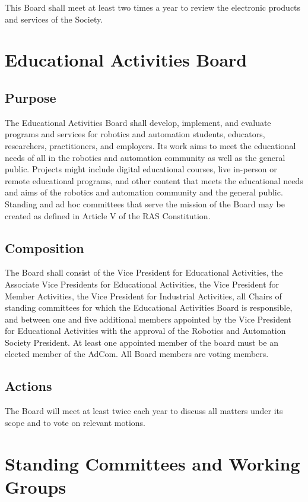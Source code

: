 \documentclass[10pt]{article}
\begin{document}
This Board shall meet at least two times a year to review the electronic products and services of the Society.


\section{Educational Activities Board}
\label{EAB}

\subsection{Purpose}
The Educational Activities Board shall develop, implement, and evaluate programs and services for robotics and automation students, educators, researchers, practitioners, and employers. Its work aims to meet the educational needs of all in the robotics and automation community as well as the general public. Projects might include digital educational courses, live in-person or remote educational programs, and other content that meets the educational needs and aims of the robotics and automation community and the general public. Standing and ad hoc committees that serve the mission of the Board may be created as defined in Article V of the RAS Constitution. 


\subsection{Composition}

The Board shall consist of the Vice President for Educational Activities, the Associate Vice Presidents for Educational Activities, the Vice President for Member Activities, the Vice President for Industrial Activities, all Chairs of standing committees for which the Educational Activities Board is responsible, and between one and five additional members appointed by the Vice President for Educational Activities with the approval of the Robotics and Automation Society President. At least one appointed member of the board must be an elected member of the AdCom. All Board members are voting members. 

\subsection{Actions}
The Board will meet at least twice each year to discuss all matters under its scope and to vote on relevant motions.


\section{Standing Committees and Working Groups}
\label{StandingCommittees}
\end{document}
